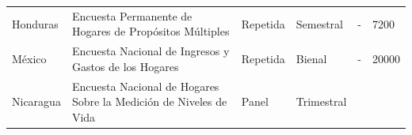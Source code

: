 \documentclass[12pt,spanish,]{book}
\begin{document}
\begin{longtable}[]{@{}llllll@{}}
\begin{minipage}[t]{0.13\columnwidth}
Honduras\strut
\end{minipage} & \begin{minipage}[t]{0.38\columnwidth}\raggedright
Encuesta Permanente de Hogares de Propósitos Múltiples\strut
\end{minipage} & \begin{minipage}[t]{0.06\columnwidth}\raggedright
Repetida\strut
\end{minipage} & \begin{minipage}[t]{0.08\columnwidth}\raggedright
Semestral\strut
\end{minipage} & \begin{minipage}[t]{0.06\columnwidth}\raggedright
-\strut
\end{minipage} & \begin{minipage}[t]{0.13\columnwidth}\raggedright
7200\strut
\end{minipage}\tabularnewline
\begin{minipage}[t]{0.13\columnwidth}\raggedright
México\strut
\end{minipage} & \begin{minipage}[t]{0.38\columnwidth}\raggedright
Encuesta Nacional de Ingresos y Gastos de los Hogares\strut
\end{minipage} & \begin{minipage}[t]{0.06\columnwidth}\raggedright
Repetida\strut
\end{minipage} & \begin{minipage}[t]{0.08\columnwidth}\raggedright
Bienal\strut
\end{minipage} & \begin{minipage}[t]{0.06\columnwidth}\raggedright
-\strut
\end{minipage} & \begin{minipage}[t]{0.13\columnwidth}\raggedright
20000\strut
\end{minipage}\tabularnewline
\begin{minipage}[t]{0.13\columnwidth}\raggedright
Nicaragua\strut
\end{minipage} & \begin{minipage}[t]{0.38\columnwidth}\raggedright
Encuesta Nacional de Hogares Sobre la Medición de Niveles de Vida\strut
\end{minipage} & \begin{minipage}[t]{0.06\columnwidth}\raggedright
Panel\strut
\end{minipage} & \begin{minipage}[t]{0.08\columnwidth}\raggedright
Trimestral\strut
\end{minipage} & \begin{minipage}[t]{0.06\columnwidth}\raggedright

\end{minipage}
\end{longtable}
\end{document}
